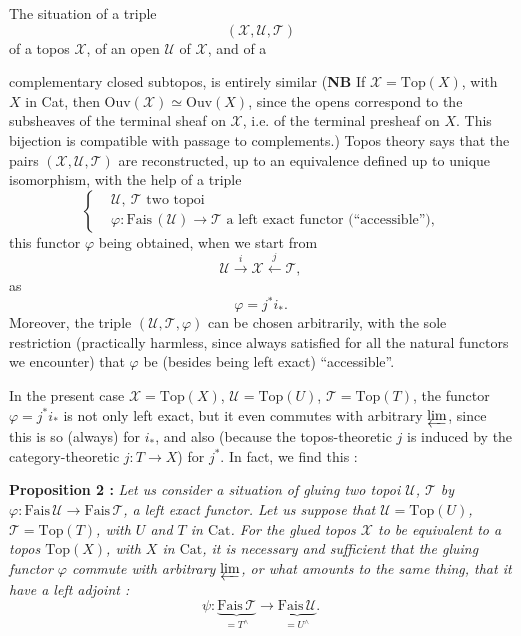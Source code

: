 The situation of a triple
\[
(\mathcal{X},\mathcal{U},\mathcal{T})
\]
of a topos $\mathcal{X}$, of an open $\mathcal{U}$ of $\mathcal{X}$, and of a


complementary closed subtopos, is entirely similar (\textbf{NB} If $\mathcal{X} = \mathrm{Top}(X)$, with $X$ in Cat, then $\mathrm{Ouv}(\mathcal{X}) \simeq \mathrm{Ouv}(X)$, since the opens correspond to the subsheaves of the terminal sheaf on $\mathcal{X}$, i.e. of the terminal presheaf on $X$. This bijection is compatible with passage to complements.) Topos theory says that the pairs $(\mathcal{X},\mathcal{U},\mathcal{T})$ are reconstructed, up to an equivalence defined up to unique isomorphism, with the help of a triple
\[
\left\{\begin{aligned}
&\mathcal{U},\ \mathcal{T} \text{ two topoi}\\[1ex]
&\varphi : \mathrm{Fais}\,(\mathcal{U}) \longrightarrow \mathcal{T} \text{ a left exact functor (``accessible''),}
\end{aligned}\right.
\]
this functor $\varphi$ being obtained, when we start from
\[
\mathcal{U} \xrightarrow{\;i\;} \mathcal{X} \xleftarrow{\;j\;} \mathcal{T},
\]
as
\[
\varphi = j^*i_*.
\]
Moreover, the triple $(\mathcal{U},\mathcal{T},\varphi)$ can be chosen arbitrarily, with the sole restriction (practically harmless, since always satisfied for all the natural functors we encounter) that $\varphi$ be (besides being left exact) ``accessible''.

In the present case $\mathcal{X} = \mathrm{Top}(X)$, $\mathcal{U} = \mathrm{Top}(U)$, $\mathcal{T} = \mathrm{Top}(T)$, the functor $\varphi = j^*i_*$ is not only left exact, but it even commutes with arbitrary $\varprojlim$, since this is so (always) for $i_*$, and also (because the topos-theoretic $j$ is induced by the category-theoretic $j : T \longrightarrow X$) for $j^*$. In fact, we
find this :

\textbf{Proposition 2 :} \textit{Let us consider a situation of gluing two topoi $\mathcal{U}$, $\mathcal{T}$ by $\varphi : \mathrm{Fais}\,\mathcal{U} \longrightarrow \mathrm{Fais}\,\mathcal{T}$, a left exact functor. Let us suppose that $\mathcal{U} = \mathrm{Top}(U)$, $\mathcal{T} = \mathrm{Top}(T)$, with $U$ and $T$ in $\mathrm{Cat}$. For the glued topos $\mathcal{X}$ to be equivalent to a topos $\mathrm{Top}(X)$, with $X$ in $\mathrm{Cat}$, it is necessary and sufficient that the gluing functor $\varphi$ commute with arbitrary $\varprojlim$, or what amounts to the same thing, that it have a left adjoint :}
\[
\psi : \underbrace{\mathrm{Fais}\,\mathcal{T}}_{= T^\wedge} \longrightarrow \underbrace{\mathrm{Fais}\,\mathcal{U}}_{= U^\wedge}.
\]

